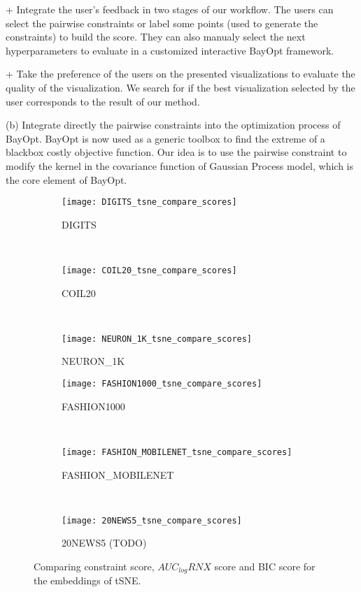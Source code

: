 + Integrate the user's feedback in two stages of our workflow.
The users can select the pairwise constraints or label some points (used to generate the constraints) to build the score.
They can also manualy select the next hyperparameters to evaluate in a customized interactive BayOpt framework.

+ Take the preference of the users on the presented visualizations to evaluate the quality of the visualization. We search for if the best visualization selected by the user corresponds to the result of our method.


(b) Integrate directly the pairwise constraints into the optimization process of BayOpt.
BayOpt is now used as a generic toolbox to find the extreme of a blackbox costly objective function.
Our idea is to use the pairwise constraint to modify the kernel in the covariance function of Gaussian Process model, which is the core element of BayOpt.



\newpage


\begin{figure*}
\centering

\begin{subfigure}[b]{0.32\textwidth}
    \centering
    \texttt{[image: DIGITS\_tsne\_compare\_scores]}
    \caption{DIGITS}
\end{subfigure}
~
\begin{subfigure}[b]{0.32\textwidth}
    \texttt{[image: COIL20\_tsne\_compare\_scores]}
    \caption{COIL20}
\end{subfigure}
~
\begin{subfigure}[b]{0.32\textwidth}
    \texttt{[image: NEURON\_1K\_tsne\_compare\_scores]}
    \caption{NEURON\_1K}
\end{subfigure}

\vfill

\begin{subfigure}[b]{0.32\textwidth}
    \centering
    \texttt{[image: FASHION1000\_tsne\_compare\_scores]}
    \caption{FASHION1000}
\end{subfigure}
~
\begin{subfigure}[b]{0.32\textwidth}
    \texttt{[image: FASHION\_MOBILENET\_tsne\_compare\_scores]}
    \caption{FASHION\_MOBILENET}
\end{subfigure}
~
\begin{subfigure}[b]{0.32\textwidth}
    \texttt{[image: 20NEWS5\_tsne\_compare\_scores]}
    \caption{20NEWS5 (TODO)}
\end{subfigure}

\caption{Comparing constraint score, $AUC_{log}RNX$ score and BIC score for the embeddings of tSNE.}
\end{figure*}


